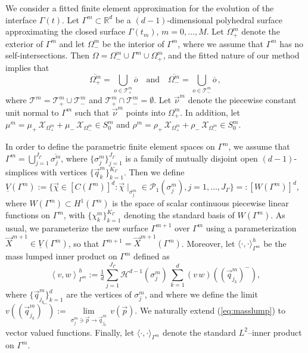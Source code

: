 \documentclass[a4paper,12pt,onecolumn]{article}
\newcommand{\R}{\mathbb R}
\newcommand{\surfvol}{\mathcal{H}^{d-1}}
\newcommand{\bigchi}{\ensuremath{\mathrm{\mathcal{X}}}}
\newcommand{\charfcn}[1]{\bigchi_{#1}} %
\newcommand{\Vh}{\underline{V}(\Gamma^m)}
\newcommand{\Wh}{W(\Gamma^m)}
\begin{document}
We consider a fitted finite element approximation for the evolution of the
interface $\Gamma(t)$. Let $\Gamma^m\subset\R^d$ be a $(d-1)$-dimensional
polyhedral surface approximating the closed surface $\Gamma(t_m)$, $m=0
,\ldots, M$. Let $\Omega^m_+$ denote the exterior of $\Gamma^m$ and let
$\Omega^m_-$ be the interior of $\Gamma^m$, where we assume that $\Gamma^m$ has
no self-intersections. Then $\Omega = \Omega_-^m \cup \Gamma^m \cup
\Omega_+^m$, and the fitted nature of
our method implies that
\begin{equation*}
\overline{\Omega^m_+} = \bigcup_{o \in \mathcal{T}^m_+} \overline{o}
\quad\text{and}\quad
\overline{\Omega^m_-} = \bigcup_{o \in \mathcal{T}^m_-} \overline{o} \,,
\end{equation*}
where $\mathcal{T}^m = \mathcal{T}^m_+ \cup \mathcal{T}^m_-$ and
$\mathcal{T}^m_+ \cap \mathcal{T}^m_- = \emptyset$. Let $\vec \nu^m$ denote the
piecewise constant unit normal to $\Gamma^m$ such that $\vec\nu^m$ points into
$\Omega^m_+$.
In addition, let
$\mu^m = \mu_+\,\charfcn{\Omega^m_+} + \mu_-\,\charfcn{\Omega^m_-}\in S^m_0$
and
$\rho^m = \rho_+\,\charfcn{\Omega^m_+} + \rho_-\,\charfcn{\Omega^m_-}
\in S^m_0$.

In order to define the parametric finite element spaces on $\Gamma^m$, we
assume that $\Gamma^m=\bigcup_{j=1}^{J_\Gamma} \overline{\sigma^m_j}$, where
$\{\sigma^m_j\}_{j=1}^{J_\Gamma}$ is a family of mutually disjoint open
$(d-1)$-simplices with vertices $\{\vec q^m_k\}_{k=1}^{K_\Gamma}$. Then
we define $\Vh := \{\vec\chi \in [C(\Gamma^m)]^d:\vec\chi\!\mid_{\sigma^m_j}
\in \mathcal{P}_1(\sigma^m_j), j=1,\ldots, J_\Gamma\} =: [\Wh]^d$, where $\Wh
\subset H^1(\Gamma^m)$ is the space of scalar continuous piecewise linear
functions on $\Gamma^m$, with $\{\chi^m_k\}_{k=1}^{K_\Gamma}$ denoting the
standard basis of $\Wh$. As usual, we parameterize the new surface
$\Gamma^{m+1}$ over $\Gamma^m$ using a parameterization $\vec X^{m+1} \in \Vh$,
so that $\Gamma^{m+1} = \vec X^{m+1}(\Gamma^m)$. Moreover, let
$\langle\cdot,\cdot\rangle_{\Gamma^m}^h$ be the mass lumped inner product on
$\Gamma^m$ defined as
\begin{equation} \label{eq:masslump}
\left\langle v, w \right\rangle^h_{\Gamma^m} :=
\tfrac1d \sum_{j=1}^{J_\Gamma} \surfvol(\sigma^m_j)\,
\sum_{k=1}^d (v\,w)((\vec q^m_{j_k})^-),
\end{equation}
where $\{\vec q^m_{j_k}\}_{k=1}^d$ are the vertices of $\sigma^m_j$, and
where we define the limit $v((\vec q^m_{j_k})^-)
:= \underset{\sigma^m_j\ni \vec p\to \vec q^m_{j_k}}{\lim}\, v(\vec p)$. We
naturally extend (\ref{eq:masslump}) to vector valued functions. Finally, let
$\langle\cdot,\cdot\rangle_{\Gamma^m}$ denote the standard $L^2$--inner product
on $\Gamma^m$.
\end{document}
